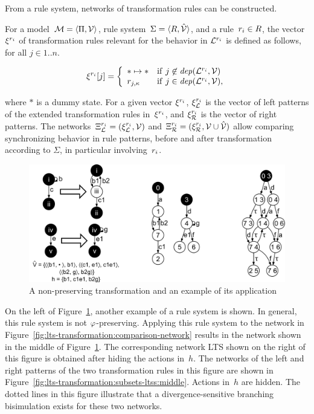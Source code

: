 From a rule system, networks of transformation rules can be constructed.

\begin{definition}
\label{def:lts-transformation:rule-network}
For a model~$\mathcal{M} = \langle \Pi, {\mathcal{V}} \rangle$, rule system~$\Sigma = \langle R,\hat{{\mathcal{V}}} \rangle$, and a rule~${r_i} \in R$, the vector~$\xi^{{r_i}}$ of transformation rules relevant for the behavior in $\mathcal{L}^{{r_i}}$ is defined as follows, for all $j \in 1..n$.

\[
\xi^{{r_i}}[j] =
\left\{
\begin{array}{ll}
\ast \mapsto \ast & {\rm if} ~ j \not\in {\it dep}(\mathcal{L}^{{r_i}}, {\mathcal{V}}) \\
r_{j,\kappa}	  & {\rm if} ~ j \in {\it dep}(\mathcal{L}^{{r_i}}, {\mathcal{V}}),
\end{array}
\right.
\]
\end{definition}

\noindent
where $\ast$ is a dummy state.
For a given vector $\xi^{{r_i}}$, $\xi_{\mathcal{L}}^{{r_i}}$ is the vector of left patterns of the extended transformation rules in~$\xi^{{r_i}}$, and $\xi_{\mathcal{R}}^{{r_i}}$ is the vector of right patterns.
The networks~$\Xi_{\mathcal{L}}^{{r_i}} = (\xi_{\mathcal{L}}^{{r_i}}, {\mathcal{V}})$ and $\Xi_{\mathcal{R}}^{{r_i}} = (\xi_{\mathcal{R}}^{{r_i}}, {\mathcal{V}} \cup \hat{{\mathcal{V}}})$ allow comparing synchronizing behavior in rule patterns, before and after transformation according to $\Sigma$, in particular involving~${r_i}$.

\begin{figure}[hbt]
\centering
\includegraphics[scale=0.2]{lts-transformation/figs/non-preserving-rules}
\caption{A non-preserving transformation and an example of its application}
\label{fig:lts-transformation:non-preserving-trafo}
\end{figure}

On the left of Figure~\ref{fig:lts-transformation:non-preserving-trafo}, another example of a rule system is shown.
In general, this rule system is not $\varphi$-preserving.
Applying this rule system to the network in Figure~\ref{fig:lts-transformation:comparison-network} results in the network shown in the middle of Figure~\ref{fig:lts-transformation:non-preserving-trafo}.
The corresponding network LTS shown on the right of this figure is obtained after hiding the actions in~$h$.
The networks of the left and right patterns of the two transformation rules in this figure are shown in Figure~\ref{fig:lts-transformation:subsets-ltss:middle}.
Actions in~$h$ are hidden.
The dotted lines in this figure illustrate that a divergence-sensitive branching bisimulation exists for these two networks.

